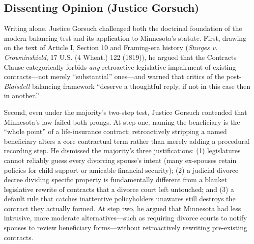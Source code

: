 \documentclass[12pt]{article}
\begin{document}
\subsection{Dissenting Opinion (Justice Gorsuch)}

Writing alone, Justice Gorsuch challenged both the doctrinal foundation of the modern balancing test and its application to Minnesota's statute. First, drawing on the text of Article I, Section 10 and Framing-era history (\textit{Sturges v. Crowninshield}, 17 U.S. (4 Wheat.) 122 (1819)), he argued that the Contracts Clause categorically forbids \textit{any} retroactive legislative impairment of existing contracts---not merely ``substantial'' ones---and warned that critics of the post-\textit{Blaisdell} balancing framework ``deserve a thoughtful reply, if not in this case then in another.''

Second, even under the majority's two-step test, Justice Gorsuch contended that Minnesota's law failed both prongs. At step one, naming the beneficiary is the ``whole point'' of a life-insurance contract; retroactively stripping a named beneficiary alters a core contractual term rather than merely adding a procedural recording step. He dismissed the majority's three justifications: (1) legislatures cannot reliably guess every divorcing spouse's intent (many ex-spouses retain policies for child support or amicable financial security); (2) a judicial divorce decree dividing specific property is fundamentally different from a blanket legislative rewrite of contracts that a divorce court left untouched; and (3) a default rule that catches inattentive policyholders unawares still destroys the contract they actually formed. At step two, he argued that Minnesota had less intrusive, more moderate alternatives---such as requiring divorce courts to notify spouses to review beneficiary forms---without retroactively rewriting pre-existing contracts.
\end{document}
